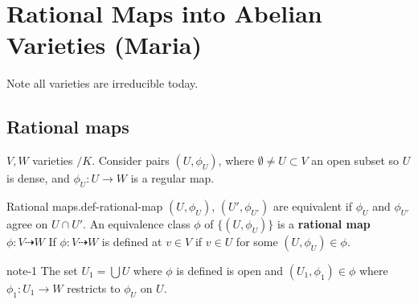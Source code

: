 \documentclass[10pt,]{book}
\newcommand{\terminology}[1]{\textbf{#1}}
\numberwithin{equation}{section}
\begin{document}
\section[{Rational Maps into Abelian Varieties (Maria)}]{Rational Maps into Abelian Varieties (Maria)}\label{sec-rational-maps-avs}
\hypertarget{p-82}{}%
Note all varieties are irreducible today.%
%
%
\typeout{************************************************}
\typeout{************************************************}
%
\subsection[{Rational maps}]{Rational maps}\label{subsection-8}
\hypertarget{p-83}{}%
\(V,W\) varieties \(/K\). Consider pairs \((U,\phi_U)\), where \(\emptyset \ne  U \subset V\) an open subset so \(U\) is dense, and \(\phi_U \colon U \to W\) is a regular map.%
\begin{definition}{Rational maps.}{def-rational-map}%
\hypertarget{p-84}{}%
\((U,\phi_U)\), \((U',{\phi_{U'}})\) are equivalent if \(\phi_U\) and \(\phi_{U'}\) agree on \(U \cap U'\). An equivalence class \(\phi\) of \(\{(U, \phi_U)\}\) is a \terminology{rational map} \(\phi \colon V \dashrightarrow W\) If \(\phi\colon V \dashrightarrow W\) is defined at   \(v\in V\) if \(v\in U\) for some \((U,\phi_U) \in \phi\).%
\end{definition}
\begin{note}{}{note-1}%
\hypertarget{p-85}{}%
The set \(U_1 = \bigcup U\) where  \(\phi\) is defined is open and \((U_1,\phi_1) \in \phi\) where \(\phi_1 \colon U_1 \to W\) restricts to \(\phi_U\) on \(U\).%
\end{note}
\end{document}
